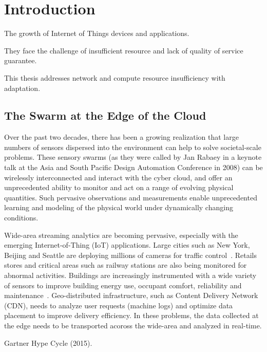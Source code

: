 \documentclass[thesis.tex]{subfiles}
\begin{document}
\chapter{Introduction}

The growth of Internet of Things devices and applications.

They face the challenge of insufficient resource and lack of quality of service
guarantee.

This thesis addresses network and compute resource insufficiency with
adaptation.

\noindent{}

\section{The Swarm at the Edge of the Cloud}

Over the past two decades, there has been a growing realization that large
numbers of sensors dispersed into the environment can help to solve
societal-scale problems. These sensory swarms (as they were called by Jan Rabaey
in a keynote talk at the Asia and South Pacific Design Automation Conference in
2008) can be wirelessly interconnected and interact with the cyber cloud, and
offer an unprecedented ability to monitor and act on a range of evolving
physical quantities. Such pervasive observations and measurements enable
unprecedented learning and modeling of the physical world under dynamically
changing conditions.

Wide-area streaming analytics are becoming pervasive, especially with the
emerging Internet-of-Thing (IoT) applications. Large cities such as New York,
Beijing and Seattle are deploying millions of cameras for traffic
control~\cite{london.surveillance,skynet}. Retails stores and critical areas
such as railway stations are also being monitored for abnormal
activities. Buildings are increasingly instrumented with a wide variety of
sensors to improve building energy use, occupant comfort, reliability and
maintenance~\cite{krioukov2012building}. Geo-distributed infrastructure, such as
Content Delivery Network (CDN), needs to analyze user requests (machine logs)
and optimize data placement to improve delivery efficiency. In these problems,
the data collected at the edge needs to be transported acoross the wide-area and
analyzed in real-time.

Gartner Hype Cycle (2015).
\end{document}
